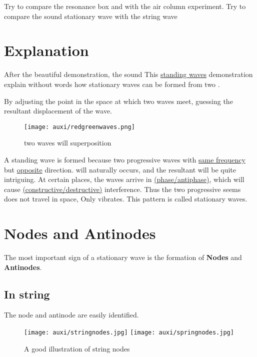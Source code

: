 \documentclass[a4paper]{tufte-handout}
\newenvironment{TaskBox} %
{\begin{tcolorbox}[breakable,colback=b1!30,colframe=b1,title=Task]} {\end{tcolorbox}}
\newenvironment{SummBox}
{\begin{tcolorbox}[breakable,colback=r1!30,colframe=r1,title=Summary]} {\end{tcolorbox}}
\begin{document}
\begin{TaskBox}
Try to compare the resonance box and with the air column experiment. 
\vspace{1in}
\tcblower
Try to compare the sound stationary wave with the string wave
\vspace{1in}
\end{TaskBox}

\section{Explanation}
After the beautiful demonstration, the sound 
This \href{https://www.desmos.com/calculator/a6ipbupfqs}{standing waves} demonstration explain without words how stationary waves can be formed from two \uline{\hspace{2in}}.

By adjusting the point in the space at which two waves meet, guessing the resultant displacement of the wave.
\begin{figure*}[h]
\centering
\texttt{[image: auxi/redgreenwaves.png]}
\caption{two waves will superposition}
\end{figure*}

\begin{SummBox}
A standing wave is formed because two progressive waves with \uline{same frequency} but \uline{opposite} direction. \uline{\hspace{1in}} will naturally occurs, and the resultant will be quite intriguing. At certain places, the waves arrive in \uline{(phase/antiphase)}, which will cause \uline{(constructive/destructive)} interference. Thus the two progressive seems does not travel in space, Only vibrates. This pattern is called stationary waves. 
\end{SummBox}

\section{Nodes and Antinodes}
The most important sign of a stationary wave is the formation of \textbf{Nodes} and \textbf{Antinodes}.

\subsection{In string}
The node and antinode are easily identified. 
\begin{figure}[h]
\centering
\texttt{[image: auxi/stringnodes.jpg]}
\texttt{[image: auxi/springnodes.jpg]}
\caption{A good illustration of string nodes}
\end{figure}
\end{document}
